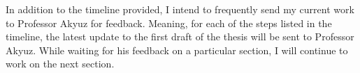 \documentclass[a4paper,11pt]{article}
\begin{document}
\begin{landscape}
	
	In addition to the timeline provided, I intend to frequently send my current work to Professor Akyuz for feedback. Meaning, for each of the steps listed in the timeline, the latest update to the first draft of the thesis will be sent to Professor Akyuz. While waiting for his feedback on a particular section, I will continue to work on the next section.
\end{landscape}




\newpage
 
 
\end{document}
